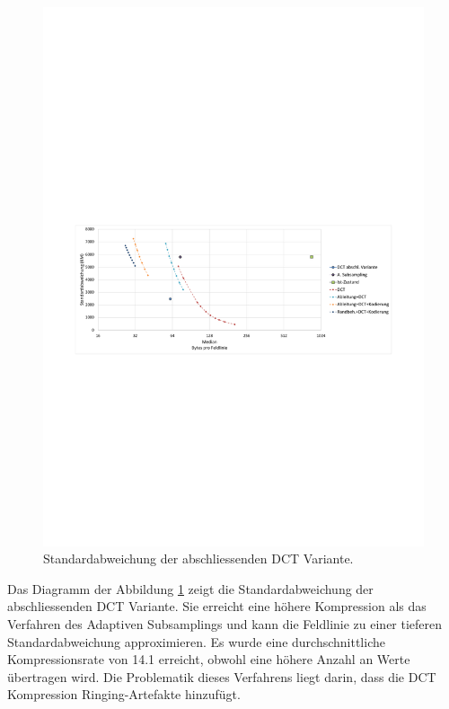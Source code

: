 \begin{figure}[!htbp]
	\center	\includegraphics[trim = 1.8cm 11cm 1.8cm 12.5cm, clip=true,width=1\textwidth,keepaspectratio]{./pictures/resultate/loesung1/loesung1-12/resultate.pdf}
	\caption{Standardabweichung der abschliessenden DCT Variante.}	\label{resultate:loesung1:dct:abschliessend:standardabweichung}
\end{figure} 
Das Diagramm der Abbildung \ref{resultate:loesung1:dct:abschliessend:standardabweichung} zeigt die Standardabweichung der abschliessenden DCT Variante. Sie erreicht eine höhere Kompression als das Verfahren des Adaptiven Subsamplings und kann die Feldlinie zu einer tieferen Standardabweichung approximieren. Es wurde eine durchschnittliche Kompressionsrate von 14.1 erreicht, obwohl eine höhere Anzahl an Werte übertragen wird. Die Problematik dieses Verfahrens liegt darin, dass die DCT Kompression Ringing-Artefakte hinzufügt.\\
